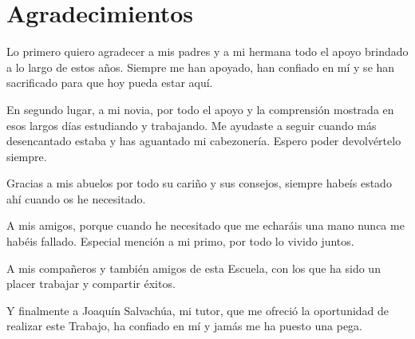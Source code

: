 \chapter*{Agradecimientos}
\justifying

Lo primero quiero agradecer a mis padres y a mi hermana todo el apoyo brindado a lo largo de estos años. Siempre me han apoyado, han confiado en mí y se han sacrificado para que hoy pueda estar aquí.

En segundo lugar, a mi novia, por todo el apoyo y la comprensión mostrada en esos largos días estudiando y trabajando. Me ayudaste a seguir cuando más desencantado estaba y has aguantado mi cabezonería. Espero poder devolvértelo siempre.

Gracias a mis abuelos por todo su cariño y sus consejos, siempre habeís estado ahí cuando os he necesitado.

A mis amigos, porque cuando he necesitado que me echaráis una mano nunca me habéis fallado. Especial mención a mi primo, por todo lo vivido juntos.

A mis compañeros y también amigos de esta Escuela, con los que ha sido un placer trabajar y compartir éxitos.

Y finalmente a Joaquín Salvachúa, mi tutor, que me ofreció la oportunidad de realizar este Trabajo, ha confiado en mí y jamás me ha puesto una pega.